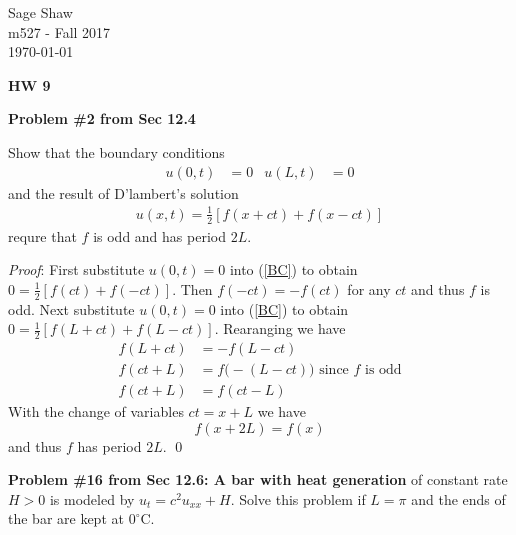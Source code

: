 \documentclass[12pt]{article}
\newcommand{\problem}[1]{\hspace{-4 ex} \large \textbf{Problem #1} }
\renewenvironment{proof}{\hspace{-4 ex} \emph{Proof}:}{\qed}
\begin{document}
	\thispagestyle{empty}
	
	\begin{flushright}
		Sage Shaw \\
		m527 - Fall 2017 \\
		\today
	\end{flushright}
	
{\large \textbf{HW 9}}\bigbreak

\problem{\#2 from Sec 12.4}

	Show that the boundary conditions
	\begin{align}
		u(0,t) &= 0 & u(L,t) &= 0 \label{BC}
	\end{align}
	and the result of D'lambert's solution
	\begin{align}
		u(x,t) = \tfrac{1}{2}[f(x+ct)+f(x-ct)] \label{eq13}
	\end{align}
	requre that $f$ is odd and has period $2L$. \bigbreak
	
	\begin{proof}
		First substitute $u(0,t)=0$ into (\ref{BC}) to obtain $0 = \tfrac{1}{2}[f(ct)+f(-ct)]$. Then $f(-ct) = -f(ct)$ for any $ct$ and thus $f$ is odd. Next substitute $u(0,t)=0$ into (\ref{BC}) to obtain $0 = \tfrac{1}{2}[f(L+ct)+f(L-ct)]$. Rearanging we have
		\begin{align*}
			f(L+ct) &= -f(L-ct) \\
			f(ct+L) &= f\big(-(L-ct)\big) \text{\ \ \ \ since $f$ is odd} \\
			f(ct+L) &= f(ct-L)
		\end{align*}
		With the change of variables $ct = x+L$ we have
		$$
		f(x+2L) = f(x)
		$$
		and thus $f$ has period $2L$.
	\end{proof} \bigbreak

\problem{\#16 from Sec 12.6: A bar with heat generation}of constant rate $H>0$ is modeled by $u_t = c^2u_{xx} + H$. Solve this problem if $L=\pi$ and the ends of the bar are kept at $0^\circ$C. \bigbreak
\end{document}
